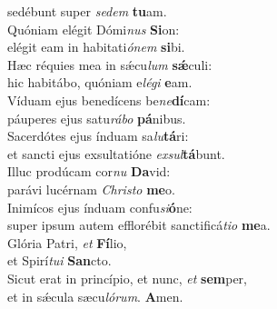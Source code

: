 \oddverse sedébunt super \textit{se}\textit{dem} \textbf{tu}am.\\
\evenverse Quóniam elégit Dómi\textit{nus} \textbf{Si}on:~\*\\
\evenverse elégit eam in habitati\textit{ó}\textit{nem} \textbf{si}bi.\\
\oddverse Hæc réquies mea in sǽcu\textit{lum} \textbf{sǽ}culi:~\*\\
\oddverse hic habitábo, quóniam e\textit{lé}\textit{gi} \textbf{e}am.\\
\evenverse Víduam ejus benedícens be\textit{ne}\textbf{dí}cam:~\*\\
\evenverse páuperes ejus satu\textit{rá}\textit{bo} \textbf{pá}nibus.\\
\oddverse Sacerdótes ejus índuam sa\textit{lu}\textbf{tá}ri:~\*\\
\oddverse et sancti ejus exsultatióne \textit{ex}\textit{sul}\textbf{tá}bunt.\\
\evenverse Illuc prodúcam cor\textit{nu} \textbf{Da}vid:~\*\\
\evenverse parávi lucérnam \textit{Chri}\textit{sto} \textbf{me}o.\\
\oddverse Inimícos ejus índuam confu\textit{si}\textbf{ó}ne:~\*\\
\oddverse super ipsum autem efflorébit sanctificá\textit{ti}\textit{o} \textbf{me}a.\\
\evenverse Glória Patri, \textit{et} \textbf{Fí}lio,~\*\\
\evenverse et Spirí\textit{tu}\textit{i} \textbf{San}cto.\\
\oddverse Sicut erat in princípio, et nunc, \textit{et} \textbf{sem}per,~\*\\
\oddverse et in sǽcula sæcu\textit{ló}\textit{rum}. \textbf{A}men.\\
